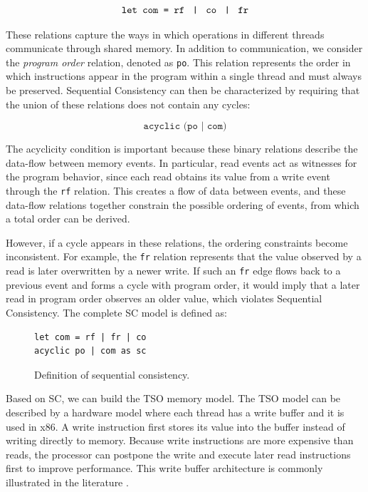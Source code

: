 \[
\texttt{let com = rf \;|\; co \;|\; fr}
\]

These relations capture the ways in which operations in different threads
communicate through shared memory. In addition to communication, we consider the \textit{program order} relation, denoted as \texttt{po}. This relation represents the order in which instructions
appear in the program within a single thread and must always be preserved. Sequential Consistency can then be characterized by requiring that the union of
these relations does not contain any cycles:

\[
\texttt{acyclic (po | com)}
\]

The acyclicity condition is important because these binary relations describe
the data-flow between memory events. In particular, read events act as witnesses
for the program behavior, since each read obtains its value from a write event
through the \texttt{rf} relation. This creates a flow of data between events,
and these data-flow relations together constrain the possible ordering of
events, from which a total order can be derived.

However, if a cycle appears in these relations, the ordering constraints become
inconsistent. For example, the \texttt{fr} relation represents that the value
observed by a read is later overwritten by a newer write. If such an \texttt{fr}
edge flows back to a previous event and forms a cycle with program order, it
would imply that a later read in program order observes an older value, which
violates Sequential Consistency. The complete SC model is defined as: 

\begin{figure}[htbp]
\centering
\begin{verbatim}
let com = rf | fr | co
acyclic po | com as sc
\end{verbatim}
\caption{Definition of sequential consistency.}
\label{fig:sequential-consistency}
\end{figure}

Based on SC, we can build the TSO memory model. The TSO model can be described by a hardware model where each
thread has a write buffer and it is used in x86. A write instruction first stores its value into the buffer instead of writing directly to memory. Because write instructions are
more expensive than reads, the processor can postpone the write and execute
later read instructions first to improve performance. This write buffer architecture is commonly illustrated in the literature \citep{sewell2010x86tso}.

